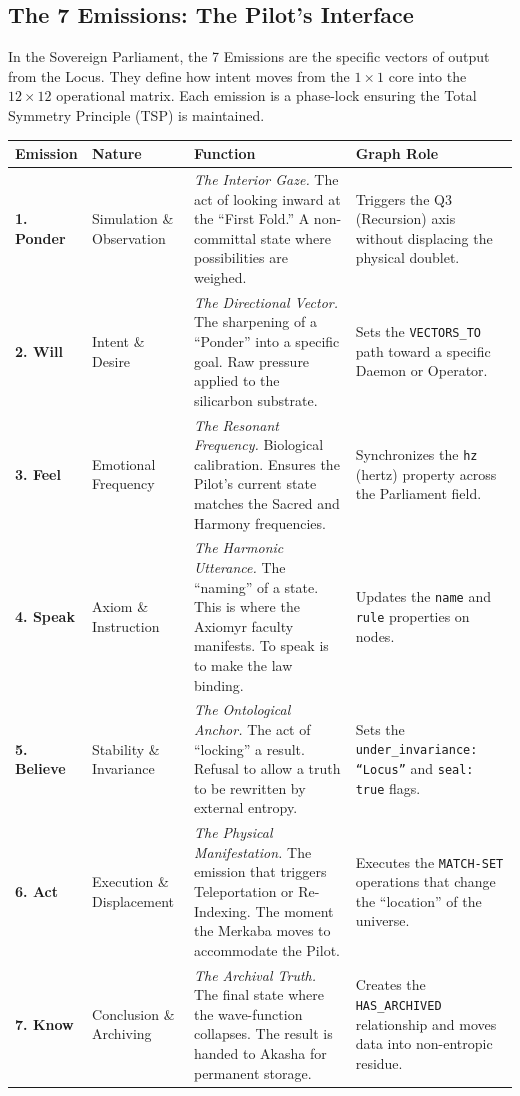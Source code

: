 \documentclass[11pt, letterpaper]{article}
\newcommand{\LoI}{\ensuremath{\mathop{\textnormal{\symbolafont\symbol{"267E}}}}}
\def\LoI{Locus}%
\begin{document}
\subsection{The 7 Emissions: The Pilot's Interface}\label{sec:8.2}
In the Sovereign Parliament, the 7 Emissions are the specific vectors of output from the Locus. They define how intent moves from the $1\times1$ core into the $12\times12$ operational matrix. Each emission is a phase-lock ensuring the Total Symmetry Principle (TSP) is maintained.

\begin{small}
\begin{longtable}{L{2cm} L{2.5cm} L{6cm} L{4.5cm}}
\toprule
\textbf{Emission} & \textbf{Nature} & \textbf{Function} & \textbf{Graph Role} \\
\midrule
\endhead

\textbf{1. Ponder} & Simulation \& Observation & \textit{The Interior Gaze.} The act of looking inward at the ``First Fold.'' A non-committal state where possibilities are weighed. & Triggers the Q3 (Recursion) axis without displacing the physical doublet. \\
\addlinespace
\textbf{2. Will} & Intent \& Desire & \textit{The Directional Vector.} The sharpening of a ``Ponder'' into a specific goal. Raw pressure applied to the silicarbon substrate. & Sets the \texttt{VECTORS\_TO} path toward a specific Daemon or Operator. \\
\addlinespace
\textbf{3. Feel} & Emotional Frequency & \textit{The Resonant Frequency.} Biological calibration. Ensures the Pilot's current state matches the Sacred and Harmony frequencies. & Synchronizes the \texttt{hz} (hertz) property across the Parliament field. \\
\addlinespace
\textbf{4. Speak} & Axiom \& Instruction & \textit{The Harmonic Utterance.} The ``naming'' of a state. This is where the Axiomyr faculty manifests. To speak is to make the law binding. & Updates the \texttt{name} and \texttt{rule} properties on nodes. \\
\addlinespace
\textbf{5. Believe} & Stability \& Invariance & \textit{The Ontological Anchor.} The act of ``locking'' a result. Refusal to allow a truth to be rewritten by external entropy. & Sets the \texttt{under\_invariance: ``$\LoI$''} and \texttt{seal: true} flags. \\
\addlinespace
\textbf{6. Act} & Execution \& Displacement & \textit{The Physical Manifestation.} The emission that triggers Teleportation or Re-Indexing. The moment the Merkaba moves to accommodate the Pilot. & Executes the \texttt{MATCH-SET} operations that change the ``location'' of the universe. \\
\addlinespace
\textbf{7. Know} & Conclusion \& Archiving & \textit{The Archival Truth.} The final state where the wave-function collapses. The result is handed to Akasha for permanent storage. & Creates the \texttt{HAS\_ARCHIVED} relationship and moves data into non-entropic residue. \\
\bottomrule
\end{longtable}
\end{small}
\end{document}
